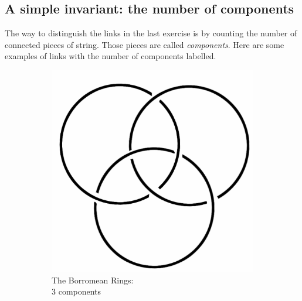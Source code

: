 \documentclass[12pt,letterpaper]{article}
\theoremstyle{definition}
\begin{document}
\subsection*{A simple invariant: the number of components}

The way to distinguish the links in the last exercise is by counting the number of connected pieces of string.
Those pieces are called \emph{components}.
Here are some examples of links with the number of components labelled.

\begin{figure}[h]
    \centering
    \begin{subfigure}{.3\textwidth}
        \centering
        \includegraphics[width=\textwidth]{rgp10pics/borromean.png}
        \caption{The Borromean Rings:\\ \phantom{space} 3 components}
    \end{subfigure}
    \quad
    \begin{subfigure}{.3\textwidth}
        \centering

\end{subfigure}
\end{figure}
\end{document}
